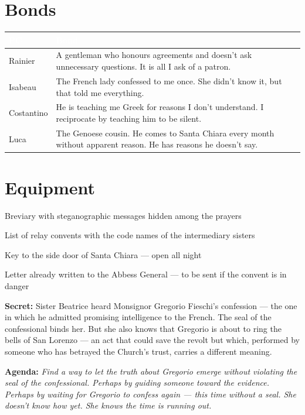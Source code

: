 \section*{Bonds}
\begin{table}[h]\centering\renewcommand{\arraystretch}{1.4}
\begin{tabularx}{\linewidth}{@{}L{2.6cm} X@{}}
\toprule{}
\textcolor{white}{\textbf{PC}} & \textcolor{white}{\textbf{Bond}} \\
\midrule
Rainier & A gentleman who honours agreements and doesn't ask unnecessary questions. It is all I ask of a patron. \\
Isabeau & The French lady confessed to me once. She didn't know it, but that told me everything. \\
Costantino & He is teaching me Greek for reasons I don't understand. I reciprocate by teaching him to be silent. \\
Luca & The Genoese cousin. He comes to Santa Chiara every month without apparent reason. He has reasons he doesn't say. \\
\bottomrule
\end{tabularx}
\end{table}

\section*{Equipment}
\begin{goldlist}
\item Breviary with steganographic messages hidden among the prayers
\item List of relay convents with the code names of the intermediary sisters
\item Key to the side door of Santa Chiara --- open all night
\item Letter already written to the Abbess General --- to be sent if the convent is in danger
\end{goldlist}

\clearpage
\begin{secretbox}
\textbf{Secret:} Sister Beatrice heard Monsignor Gregorio Fieschi's confession ---
the one in which he admitted promising intelligence to the French. The seal of the
confessional binds her. But she also knows that Gregorio is about to ring the bells
of San Lorenzo --- an act that could save the revolt but which, performed by someone
who has betrayed the Church's trust, carries a different meaning.

\medskip\noindent\textcolor{SecretRed}{\textbf{Agenda:}}
\textit{Find a way to let the truth about Gregorio emerge without violating the seal
of the confessional. Perhaps by guiding someone toward the evidence. Perhaps by waiting
for Gregorio to confess again --- this time without a seal. She doesn't know how yet.
She knows the time is running out.}
\end{secretbox}

